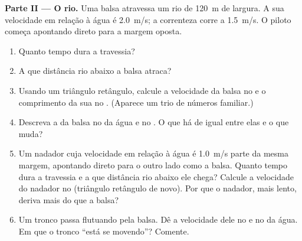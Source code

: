 \begin{problem}
\medskip
\noindent\textbf{Parte II --- O rio.}
Uma balsa atravessa um rio de \qty{120}{m} de largura. A sua velocidade
em relação à água é \qty{2.0}{m/s}; a correnteza corre a \qty{1.5}{m/s}.
O piloto começa apontando direto para a margem oposta.
\begin{enumerate}[resume]
  \item Quanto tempo dura a travessia?
  \item A que distância rio abaixo a balsa atraca?
  \item Usando um triângulo retângulo, calcule a velocidade da balsa no
         e o comprimento da sua  no
        . (Aparece um trio de números familiar.)
  \item Descreva a  da balsa no  da água e no
        . O que há de igual entre elas e o que muda?
  \item Um nadador cuja velocidade em relação à água é \qty{1.0}{m/s}
        parte da mesma margem, apontando direto para o outro lado como a
        balsa. Quanto tempo dura a travessia e a que distância rio abaixo
        ele chega? Calcule a velocidade do nadador no 
        (triângulo retângulo de novo). Por que o nadador, mais lento,
        deriva mais do que a balsa?
  \item Um tronco passa flutuando pela balsa. Dê a velocidade dele no
         e no  da água. Em que 
        o tronco ``está se movendo''? Comente.
\end{enumerate}


\end{problem}
